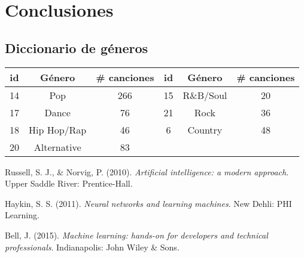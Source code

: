 \documentclass[spanish,11pt,letterpaper]{article}
\begin{document}
\section{Conclusiones}

\begin{appendices}
\section{Diccionario de géneros}
\begin{center}
\begin{tabular}{|c|c|c||c|c|c|}
\hline
id & Género & \# canciones & id & Género & \# canciones\\
\hline
14 & Pop & 266 & 15 & R\&B/Soul & 20 \\
17 & Dance & 76 & 21 & Rock & 36 \\
18 & Hip Hop/Rap & 46 & 6 & Country & 48 \\
20 & Alternative & 83 & & & \\
\hline
\end{tabular}
\end{center}
\end{appendices}

\begin{thebibliography}{9}
Russell, S. J., \& Norvig, P. (2010).
\textit{Artificial intelligence: a modern approach}.
Upper Saddle River: Prentice-Hall.

Haykin, S. S. (2011).
\textit{Neural networks and learning machines}.
New Dehli: PHI Learning.

Bell, J. (2015).
\textit{Machine learning: hands-on for developers and technical professionals}.
Indianapolis: John Wiley \& Sons.
\end{thebibliography}
\end{document}
